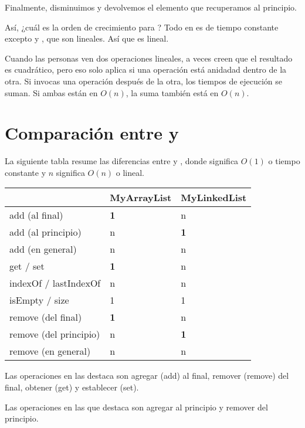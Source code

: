 \documentclass[12pt]{book}
\theoremstyle{exercise}
\begin{document}
Finalmente, disminuimos  y devolvemos el elemento que recuperamos
al principio.

Así, ¿cuál es la orden de crecimiento para ? Todo en
 es de tiempo constante excepto  y
, que son lineales. Así que  es lineal.

Cuando las personas ven dos operaciones lineales, a veces creen que el resultado
es cuadrático, pero eso solo aplica si una operación está anidadad dentro de
la otra. Si invocas una operación después de la otra, los tiempos de ejecución
se suman. Si ambas están en $O(n)$, la suma también está en
$O(n)$.



\section{Comparación entre  y }
\label{comparing-mylinkedlist-and-myarraylist}


La siguiente tabla resume las diferencias entre
 y , donde  significa
$O(1)$ o tiempo constante y $n$ significa $O(n)$ o
lineal.

\begin{tabular}[c]{@{}lll@{}}
\hline
& MyArrayList & MyLinkedList \\
\hline
add (al final) & \textbf{1} & n
\\
add (al principio) & n & \textbf{1}
\\
add (en general) & n & n
\\
get / set & \textbf{1} & n
\\
indexOf / lastIndexOf & n & n
\\
isEmpty / size & 1 & 1
\\
remove (del final) & \textbf{1} & n
\\
remove (del principio) & n & \textbf{1}
\\
remove (en general) & n & n
\\
\hline
\end{tabular}

Las operaciones en las  destaca son agregar (add) al final,
remover (remove) del final, obtener (get) y establecer (set).

Las operaciones en las que  destaca son agregar al
principio y remover del principio.
\end{document}
